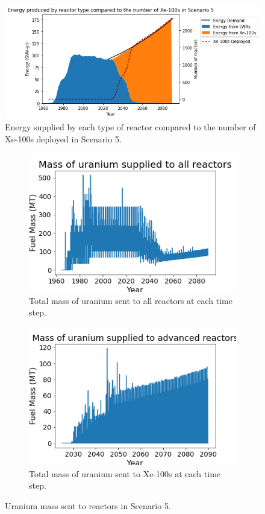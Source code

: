 \begin{figure}
    \centering 
    \includegraphics[scale=0.5]{figures/energy_scenario5.png}
    \caption{Energy supplied by each type of reactor compared to the number of 
    Xe-100s deployed in Scenario 5.}
    \label{fig:energy_rx_5}
\end{figure}

\begin{figure}
    \centering
    \begin{subfigure}{0.4\textwidth}
        \centering
        \includegraphics[scale=0.3]{figures/fuelsupply_scenarios_5.png}
        \caption{Total mass of uranium sent to all reactors at each time step.}
        \label{fig:totalfuel_5}
    \end{subfigure}
    \begin{subfigure}{0.4\textwidth}
        \centering
        \includegraphics[scale=0.3]{figures/advancedRX_fuelsupply_scenarios_5.png}
        \caption{Total mass of uranium sent to Xe-100s at each time step.}
        \label{fig:haleu_5}
    \end{subfigure}
    \caption{Uranium mass sent to reactors in Scenario 5.}
    \label{fig:fuel_5}
\end{figure}


